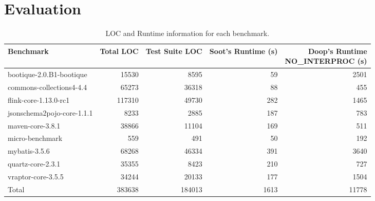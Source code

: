 \section{Evaluation}
\label{sec:evaluation}

\begin{table*}[b]
	\centering
	\caption{LOC and Runtime information for each benchmark.}
	\begin{tabular}{lrrrr}
		\toprule
		Benchmark & Total LOC & Test Suite LOC & Soot's Runtime (s)  & \thead{Doop's Runtime \\ NO\_INTERPROC (s)} \\
		\midrule
		bootique-2.0.B1-bootique           		&  15530   & 8595   &  59   & 2501       \\
		commons-collections4-4.4           		&  65273   & 36318  &  88   & 455        \\
		flink-core-1.13.0-rc1           		&  117310  & 49730  &  282  & 1465        \\
		jsonschema2pojo-core-1.1.1         		&  8233    & 2885   &  187  & 783       \\
		maven-core-3.8.1   		           		&  38866   & 11104  &  169  & 511        \\
		micro-benchmark         		  		&  559     & 491	&  50   & 192        \\
		mybatis-3.5.6         		  			&  68268   & 46334  &  391  & 3640        \\
		quartz-core-2.3.1        	  			&  35355   & 8423   &  210  & 727      \\
		vraptor-core-3.5.5         	  			&  34244   & 20133  &  177  & 1504      \\
		\bottomrule
		Total         	  						&  383638  & 184013 &  1613  & 11778      \\
	\end{tabular}
	\label{tab:runtimes}
\end{table*}

